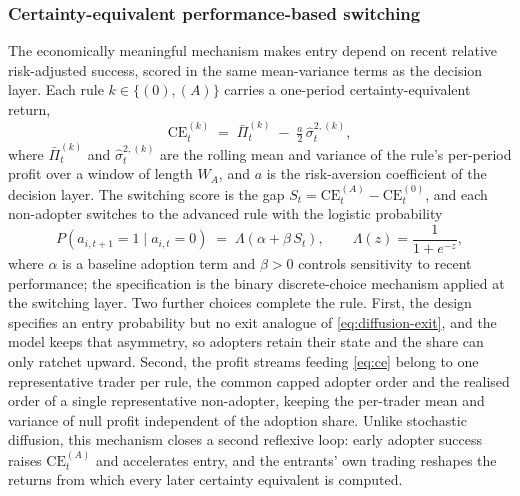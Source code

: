 \documentclass[12pt]{article}
\begin{document}
\subsubsection{Certainty-equivalent performance-based switching}

The economically meaningful mechanism makes entry depend on recent relative risk-adjusted success, scored in the same mean-variance terms as the decision layer. Each rule $k \in \{(0), (A)\}$ carries a one-period certainty-equivalent return, %
\begin{equation}
  \mathrm{CE}_t^{(k)} \;=\; \bar{\Pi}_t^{(k)} \;-\; \tfrac{a}{2}\, \hat{\sigma}_{t}^{2,(k)},
  \label{eq:ce}
\end{equation}
where $\bar{\Pi}_t^{(k)}$ and $\hat{\sigma}_{t}^{2,(k)}$ are the rolling mean and variance of the rule's per-period profit over a window of length $W_A$, and $a$ is the risk-aversion coefficient of the decision layer. The switching score is the gap $S_t = \mathrm{CE}_t^{(A)} - \mathrm{CE}_t^{(0)}$, and each non-adopter switches to the advanced rule with the logistic probability %
\begin{equation}
  P(a_{i,t+1} = 1 \mid a_{i,t} = 0) \;=\; \Lambda(\alpha + \beta\, S_t), \qquad \Lambda(z) = \frac{1}{1 + e^{-z}},
  \label{eq:logit-switch}
\end{equation}
where $\alpha$ is a baseline adoption term and $\beta > 0$ controls sensitivity to recent performance; the specification is the binary \citet{brockhommes1998} discrete-choice mechanism applied at the switching layer. %
Two further choices complete the rule. First, the design specifies an entry probability but no exit analogue of \eqref{eq:diffusion-exit}, and the model keeps that asymmetry, so adopters retain their state and the share can only ratchet upward. %
Second, the profit streams feeding \eqref{eq:ce} belong to one representative trader per rule, the common capped adopter order and the realised order of a single representative non-adopter, keeping the per-trader mean and variance of null profit independent of the adoption share. %
Unlike stochastic diffusion, this mechanism closes a second reflexive loop: early adopter success raises $\mathrm{CE}_t^{(A)}$ and accelerates entry, and the entrants' own trading reshapes the returns from which every later certainty equivalent is computed. %
\end{document}
